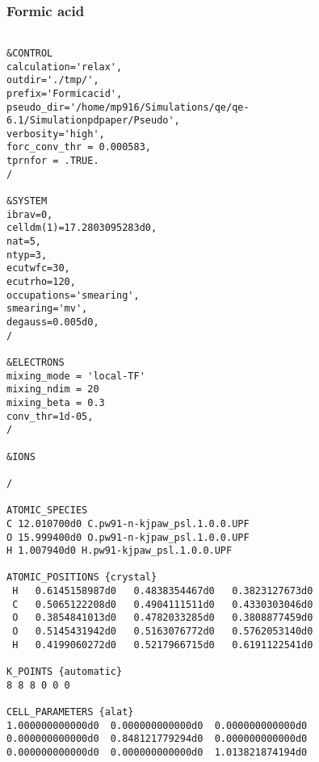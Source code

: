 \subsubsection*{Formic acid}
\begin{verbatim}
    
&CONTROL
calculation='relax',
outdir='./tmp/',
prefix='Formicacid',
pseudo_dir='/home/mp916/Simulations/qe/qe-6.1/Simulationpdpaper/Pseudo',
verbosity='high',
forc_conv_thr = 0.000583,
tprnfor = .TRUE.
/

&SYSTEM
ibrav=0,
celldm(1)=17.2803095283d0,
nat=5,
ntyp=3,
ecutwfc=30,
ecutrho=120,
occupations='smearing',
smearing='mv',
degauss=0.005d0,
/

&ELECTRONS
mixing_mode = 'local-TF'
mixing_ndim = 20
mixing_beta = 0.3
conv_thr=1d-05,
/

&IONS

/

ATOMIC_SPECIES
C 12.010700d0 C.pw91-n-kjpaw_psl.1.0.0.UPF
O 15.999400d0 O.pw91-n-kjpaw_psl.1.0.0.UPF
H 1.007940d0 H.pw91-kjpaw_psl.1.0.0.UPF

ATOMIC_POSITIONS {crystal}
 H   0.6145158987d0   0.4838354467d0   0.3823127673d0
 C   0.5065122208d0   0.4904111511d0   0.4330303046d0
 O   0.3854841013d0   0.4782033285d0   0.3808877459d0
 O   0.5145431942d0   0.5163076772d0   0.5762053140d0
 H   0.4199060272d0   0.5217966715d0   0.6191122541d0

K_POINTS {automatic}
8 8 8 0 0 0

CELL_PARAMETERS {alat}
1.000000000000d0  0.000000000000d0  0.000000000000d0
0.000000000000d0  0.848121779294d0  0.000000000000d0
0.000000000000d0  0.000000000000d0  1.013821874194d0


\end{verbatim}

